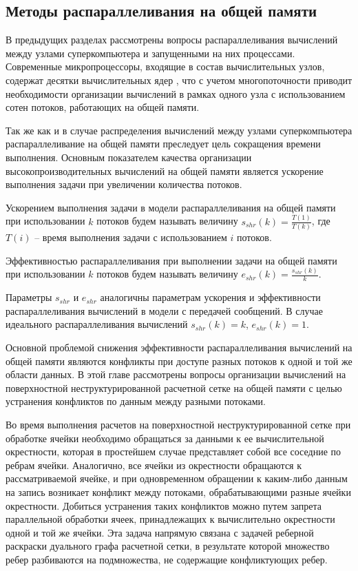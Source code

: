 \subsection{Методы распараллеливания на общей памяти}

В предыдущих разделах рассмотрены вопросы распараллеливания вычислений между узлами суперкомпьютера и запущенными на них процессами.
Современные микропроцессоры, входящие в состав вычислительных узлов, содержат десятки вычислительных ядер \cite{Section3IntroIntel,Section3IntroAMD,Kuzminsky2022ARM}, что с учетом многопоточности приводит необходимости организации вычислений в рамках одного узла с использованием сотен потоков, работающих на общей памяти.

Так же как и в случае распределения вычислений между узлами суперкомпьютера распараллеливание на общей памяти преследует цель сокращения времени выполнения.
Основным показателем качества организации высокопроизводительных вычислений на общей памяти является ускорение выполнения задачи при увеличении количества потоков.

\begin{definition}
Ускорением выполнения задачи в модели распараллеливания на общей памяти при использовании $k$ потоков будем называть величину $s_{shr}(k) = \frac{T(1)}{T(k)}$, где $T(i)$ -- время выполнения задачи с использованием $i$ потоков.
\end{definition}

\begin{definition}
Эффективностью распараллеливания при выполнении задачи на общей памяти при использовании $k$ потоков будем называть величину $e_{shr}(k) = \frac{s_{shr}(k)}{k}$.
\end{definition}

Параметры $s_{shr}$ и $e_{shr}$ аналогичны параметрам ускорения и эффективности распараллеливания вычислений в модели с передачей сообщений.
В случае идеального распараллеливания вычислений $s_{shr}(k) = k$, $e_{shr}(k) = 1$.

Основной проблемой снижения эффективности распараллеливания вычислений на общей памяти являются конфликты при доступе разных потоков к одной и той же области данных.
В этой главе рассмотрены вопросы организации вычислений на поверхностной неструктурированной расчетной сетке на общей памяти с целью устранения конфликтов по данным между разными потоками.

Во время выполнения расчетов на поверхностной неструктурированной сетке при обработке ячейки необходимо обращаться за данными к ее вычислительной окрестности, которая в простейшем случае представляет собой все соседние по ребрам ячейки.
Аналогично, все ячейки из окрестности обращаются к рассматриваемой ячейке, и при одновременном обращении к каким-либо данным на запись возникает конфликт между потоками, обрабатывающими разные ячейки окрестности.
Добиться устранения таких конфликтов можно путем запрета параллельной обработки ячеек, принадлежащих к вычислительно окрестности одной и той же ячейки.
Эта задача напрямую связана с задачей реберной раскраски дуального графа расчетной сетки, в результате которой множество ребер разбиваются на подмножества, не содержащие конфликтующих ребер.

